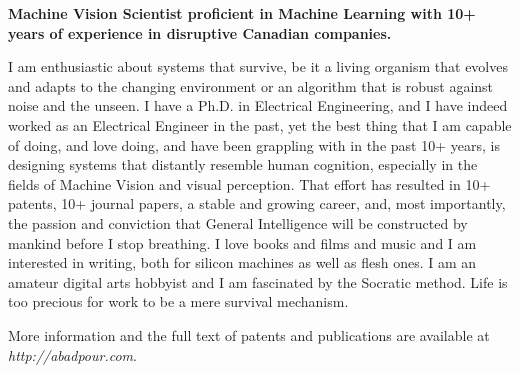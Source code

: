 \onehalfspace
\textbf{\large Machine Vision Scientist proficient in Machine Learning with 10+ years of experience in disruptive Canadian companies.}
\singlespace

\vspace{1cm}

I am enthusiastic about systems that survive, be it a living organism that evolves and adapts to the changing environment or an algorithm that is robust against noise and the unseen. I have a Ph.D. in Electrical Engineering, and I have indeed worked as an Electrical Engineer in the past, yet the best thing that I am capable of doing, and love doing, and have been grappling with in the past 10+ years, is designing systems that distantly resemble human cognition, especially in the fields of Machine Vision and visual perception. That effort has resulted in 10+ patents, 10+ journal papers, a stable and growing career, and, most importantly, the passion and conviction that General Intelligence will be constructed by mankind before I stop breathing. I love books and films and music and I am interested in writing, both for silicon machines as well as flesh ones. I am an amateur digital arts hobbyist and I am fascinated by the Socratic method. Life is too precious for work to be a mere survival mechanism.

\vspace{0.5cm}
More information and the full text of patents and publications are available at \emph{http://abadpour.com}.

\vspace{1.5cm}

